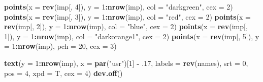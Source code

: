 \documentclass[]{book}
\newenvironment{Shaded}{\begin{snugshade}}{\end{snugshade}}
\newcommand{\KeywordTok}[1]{\textcolor[rgb]{0.13,0.29,0.53}{\textbf{{#1}}}}
\newcommand{\DataTypeTok}[1]{\textcolor[rgb]{0.13,0.29,0.53}{{#1}}}
\newcommand{\DecValTok}[1]{\textcolor[rgb]{0.00,0.00,0.81}{{#1}}}
\newcommand{\StringTok}[1]{\textcolor[rgb]{0.31,0.60,0.02}{{#1}}}
\newcommand{\OperatorTok}[1]{\textcolor[rgb]{0.81,0.36,0.00}{\textbf{{#1}}}}
\newcommand{\NormalTok}[1]{{#1}}
\theoremstyle{definition}
\theoremstyle{definition}
\theoremstyle{remark}
\begin{document}
\begin{Shaded}
\begin{Highlighting}[]
\KeywordTok{points}\NormalTok{(}\DataTypeTok{x =} \KeywordTok{rev}\NormalTok{(imp[, }\DecValTok{4}\NormalTok{]), }\DataTypeTok{y =} \DecValTok{1}\OperatorTok{:}\KeywordTok{nrow}\NormalTok{(imp), }\DataTypeTok{col =} \StringTok{"darkgreen"}\NormalTok{, }\DataTypeTok{cex =} \DecValTok{2}\NormalTok{)}
\KeywordTok{points}\NormalTok{(}\DataTypeTok{x =} \KeywordTok{rev}\NormalTok{(imp[, }\DecValTok{3}\NormalTok{]), }\DataTypeTok{y =} \DecValTok{1}\OperatorTok{:}\KeywordTok{nrow}\NormalTok{(imp), }\DataTypeTok{col =} \StringTok{"red"}\NormalTok{, }\DataTypeTok{cex =} \DecValTok{2}\NormalTok{)}
\KeywordTok{points}\NormalTok{(}\DataTypeTok{x =} \KeywordTok{rev}\NormalTok{(imp[, }\DecValTok{2}\NormalTok{]), }\DataTypeTok{y =} \DecValTok{1}\OperatorTok{:}\KeywordTok{nrow}\NormalTok{(imp), }\DataTypeTok{col =} \StringTok{"blue"}\NormalTok{, }\DataTypeTok{cex =} \DecValTok{2}\NormalTok{)}
\KeywordTok{points}\NormalTok{(}\DataTypeTok{x =} \KeywordTok{rev}\NormalTok{(imp[, }\DecValTok{1}\NormalTok{]), }\DataTypeTok{y =} \DecValTok{1}\OperatorTok{:}\KeywordTok{nrow}\NormalTok{(imp), }\DataTypeTok{col =} \StringTok{"darkorange1"}\NormalTok{, }\DataTypeTok{cex =} \DecValTok{2}\NormalTok{)}
\KeywordTok{points}\NormalTok{(}\DataTypeTok{x =} \KeywordTok{rev}\NormalTok{(imp[, }\DecValTok{5}\NormalTok{]), }\DataTypeTok{y =} \DecValTok{1}\OperatorTok{:}\KeywordTok{nrow}\NormalTok{(imp), }\DataTypeTok{pch =} \DecValTok{20}\NormalTok{, }\DataTypeTok{cex =} \DecValTok{3}\NormalTok{)}


\KeywordTok{text}\NormalTok{(}\DataTypeTok{y =} \DecValTok{1}\OperatorTok{:}\KeywordTok{nrow}\NormalTok{(imp), }\DataTypeTok{x =} \KeywordTok{par}\NormalTok{(}\StringTok{"usr"}\NormalTok{)[}\DecValTok{1}\NormalTok{] }\OperatorTok{-}\StringTok{ }\NormalTok{.}\DecValTok{17}\NormalTok{, }\DataTypeTok{labels =} \KeywordTok{rev}\NormalTok{(names),}
     \DataTypeTok{srt =} \DecValTok{0}\NormalTok{, }\DataTypeTok{pos =} \DecValTok{4}\NormalTok{, }\DataTypeTok{xpd =}\NormalTok{ T, }\DataTypeTok{cex =} \DecValTok{4}\NormalTok{)}
\KeywordTok{dev.off}\NormalTok{()}
\end{Highlighting}
\end{Shaded}
\end{document}
